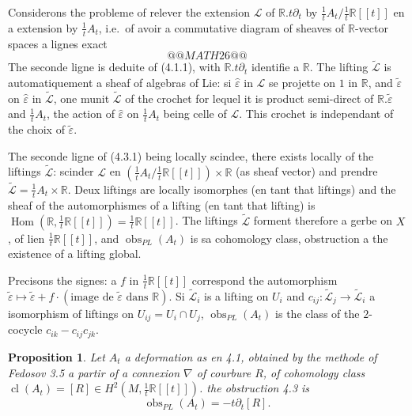 \documentclass[11pt,a4paper]{article}
\theoremstyle{plain}
\newtheorem{proposition}[theorem]{Proposition}
\theoremstyle{definition}
\DeclareMathOperator{\Hom}{Hom}
\DeclareMathOperator{\cl}{cl}
\DeclareMathOperator{\obs}{obs}
\newcommand{\R}{\mathbb{R}}
\begin{document}
Considerons the probleme of relever the extension $\mathcal{L}$ of $\R.t\partial_{t}$ by $\tfrac{1}{t}A_{t}/\tfrac{1}{t}\R[[t]]$ en a extension by $\tfrac{1}{t}A_{t}$, i.e.\ of avoir a commutative diagram of sheaves of $\R$-vector spaces a lignes exact
\[
@@MATH26@@ \tag{4.3.1}
\]
The seconde ligne is deduite of (4.1.1), with $\R.t\partial_{t}$ identifie a $\R$. The lifting $\widetilde{\mathcal{L}}$ is automatiquement a sheaf of algebras of Lie: si $\hat{\varepsilon}$ in $\mathcal{L}$ se projette on $1$ in $\R$, and $\tilde{\varepsilon}$ on $\hat{\varepsilon}$ in $\widetilde{\mathcal{L}}$, one munit $\widetilde{\mathcal{L}}$ of the crochet for lequel it is product semi-direct of $\R.\tilde{\varepsilon}$ and $\tfrac{1}{t}A_{t}$, the action of $\hat{\varepsilon}$ on $\tfrac{1}{t}A_{t}$ being celle of $\mathcal{L}$. This crochet is independant of the choix of $\tilde{\varepsilon}$.

The seconde ligne of (4.3.1) being locally scindee, there exists locally
of the liftings $\widetilde{\mathcal{L}}$: scinder $\mathcal{L}$ en $(\tfrac{1}{t}A_{t}/\tfrac{1}{t}\R[[t]]) \times \R$ (as sheaf vector) and
prendre $\widetilde{\mathcal{L}} = \tfrac{1}{t}A_{t} \times \R$. Deux liftings are locally isomorphes (en tant
that liftings) and the sheaf of the automorphismes of a lifting (en tant that
lifting) is $\Hom(\R, \tfrac{1}{t}\R[[t]]) = \tfrac{1}{t}\R[[t]]$. The liftings $\widetilde{\mathcal{L}}$ forment therefore a gerbe
on $X$, of lien $\tfrac{1}{t}\R[[t]]$, and $\obs_{PL}(A_{t})$ is sa cohomology class, obstruction a the existence of a lifting global.

Precisons the signes: a $f$ in $\tfrac{1}{t}\R[[t]]$ correspond the automorphism $\tilde{\varepsilon} \mapsto \tilde{\varepsilon} + f \cdot (\text{image de } \tilde{\varepsilon} \text{ dans } \R)$. Si $\widetilde{\mathcal{L}}_{i}$ is a lifting on $U_{i}$ and $c_{ij}: \widetilde{\mathcal{L}}_{j} \to \widetilde{\mathcal{L}}_{i}$ a isomorphism of liftings on $U_{ij} = U_{i} \cap U_{j}$, $\obs_{PL}(A_{t})$ is the class of the $2$-cocycle $c_{ik} - c_{ij} c_{jk}$.

\begin{proposition}
Let $A_{t}$ a deformation as en 4.1, obtained by the methode of Fedosov 3.5 a partir of a connexion $\nabla$ of courbure $R$, of cohomology class $\cl(A_{t}) = [R] \in H^{2}(M, \tfrac{1}{t}\R[[t]])$. the obstruction 4.3 is
\[
\obs_{PL}(A_{t}) = -t\partial_{t}[R].
\]
\end{proposition}
\end{document}

